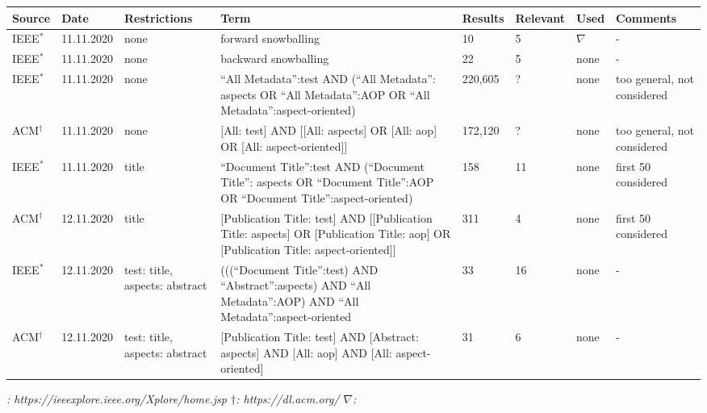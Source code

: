 \newpage
{}
\begin{landscape}
\begin{small}
\begin{table}
\caption{Literature Research Documentation.}
\begin{longtable}{p{1.3cm}|p{1.8cm}|>{\raggedright}p{2.3cm}|>{\raggedright}p{6cm}|p{1.5cm}|p{1.5cm}|p{1.2cm}|p{2cm}}

\hline
\textbf{Source} & \textbf{Date} & \textbf{Restrictions} & \textbf{Term} & \textbf{Results} & \textbf{Relevant} & \textbf{Used} & \textbf{Comments}\\
\hline
IEEE$^*$ & 11.11.2020 & none & forward snowballing & 10 & 5 & $\nabla$ & -\\
\hline
IEEE$^*$ & 11.11.2020 & none & backward snowballing & 22 & 5 & none & -\\
\hline
IEEE$^*$ & 11.11.2020 & none & \enquote{All Metadata}:test AND (\enquote{All Metadata}: aspects OR \enquote{All Metadata}:AOP OR \enquote{All Metadata}:aspect-oriented) & 220,605 & ? & none & too general, not considered\\
\hline
ACM$^\dagger$ & 11.11.2020 & none & [All: test] AND [[All: aspects] OR [All: aop] OR [All: aspect-oriented]] & 172,120 & ? & none & too general, not considered\\
\hline
IEEE$^*$ & 11.11.2020 & title &\enquote{Document Title}:test AND (\enquote{Document Title}: aspects OR \enquote{Document Title}:AOP OR \enquote{Document Title}:aspect-oriented) & 158 & 11 & none & first 50 considered\\
\hline
ACM$^\dagger$ & 12.11.2020 & title &[Publication Title: test] AND [[Publication Title: aspects] OR [Publication Title: aop] OR [Publication Title: aspect-oriented]] & 311 & 4 & none & first 50 considered\\
\hline
IEEE$^*$ & 12.11.2020 & test: title, aspects: abstract &(((\enquote{Document Title}:test) AND \enquote{Abstract}:aspects) AND \enquote{All Metadata}:AOP) AND \enquote{All Metadata}:aspect-oriented & 33 & 16 & none & -\\
\hline
ACM$^\dagger$ & 12.11.2020 & test: title, aspects: abstract &[Publication Title: test] AND [Abstract: aspects] AND [All: aop] AND [All: aspect-oriented] & 31 & 6 & none & -\\
\hline
\end{longtable}
\textit{\qquad \qquad \qquad \qquad \qquad *: https://ieeexplore.ieee.org/Xplore/home.jsp \quad $\dagger$: https://dl.acm.org/ \quad $\nabla$: \cite{Duclos}}
\label{doc}
\end{table}
\end{small}
\end{landscape}
\restoregeometry

